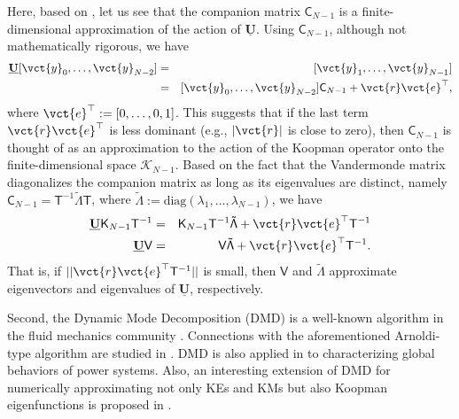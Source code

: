 \documentclass[a4paper,10pt]{article}
\begin{document}
%
Here, based on \cite{Chen_JNLS22,Marko_CHAOS22}, let us see that the companion matrix $\mathsf{C}_{N-1}$ is a finite-dimensional approximation of the action of $\mathbf{\underline{U}}$.   
Using $\mathsf{C}_{N-1}$, although not mathematically rigorous, we have
\begin{eqnarray}
\mathbf{\underline{U}}[\vct{y}_0,\ldots,\vct{y}_{N-2}]
&=&[\vct{y}_1,\ldots,\vct{y}_{N-1}] \label{eqn:hoge}\\
&=&[\vct{y}_0,\ldots,\vct{y}_{N-2}]\mathsf{C}_{N-1}+\vct{r}\vct{e}^\top,\nonumber
\end{eqnarray}
where $\vct{e}^\top:=[0,\ldots,0,1]$. 
This suggests that if the last term $\vct{r}\vct{e}^\top$ is less dominant (e.g., $|\vct{r}|$ is close to zero), then $\mathsf{C}_{N-1}$ is thought of as an approximation to the action of the Koopman operator onto the finite-dimensional space $\mathcal{K}_{N-1}$.  
Based on the fact that the Vandermonde matrix diagonalizes the companion matrix as long as its eigenvalues are distinct, namely $\mathsf{C}_{N-1}=\mathsf{T}^{-1}\mathsf{\tilde{\Lambda}}\mathsf{T}$, where $\mathsf{\tilde{\Lambda}}:=\mathrm{diag}(\lambda_1,\ldots,\lambda_{N-1})$, we have
\begin{eqnarray}
\mathbf{\underline{U}}\mathsf{K}_{N-1}\mathsf{T}^{-1} 
&=& \mathsf{K}_{N-1}\mathsf{T}^{-1}\mathsf{\tilde{\Lambda}}+\vct{r}\vct{e}^\top\mathsf{T}^{-1}
\nonumber\\
\mathbf{\underline{U}}\mathsf{V}&=& \mathsf{V}\mathsf{\tilde{\Lambda}}+\vct{r}\vct{e}^\top\mathsf{T}^{-1}.
\nonumber
\end{eqnarray}
That is, if $||\vct{r}\vct{e}^\top\mathsf{T}^{-1}||$ is small, then $\mathsf{V}$ and $\mathsf{\tilde{\Lambda}}$ approximate eigenvectors and eigenvalues of $\mathbf{\underline{U}}$, respectively. 

%
\vspace*{2mm}

Second, the Dynamic Mode Decomposition (DMD) is a well-known algorithm in the fluid mechanics community \cite{Schmid_JFM656,Jovanovic_PF26}.  
Connections with the aforementioned Arnoldi-type algorithm are studied in \cite{Chen_JNLS22,Tu_JCD1}.  
DMD is also applied in \cite{Barocio_IEEETPWRS30} to characterizing global behaviors of power systems. 
Also, an interesting extension of DMD for numerically approximating not only KEs and KMs but also Koopman eigenfunctions is proposed in \cite{Matt_JNLS25}.  
\end{document}
